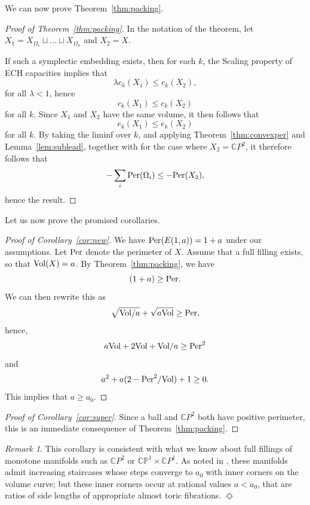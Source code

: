 \documentclass[11pt, reqno]{amsart}
\theoremstyle{remark}
\numberwithin{equation}{subsection}
\numberwithin{figure}{section}
\theoremstyle{customremark}
\newtheorem{rmk_no_diamond}[thm]{Remark}
\newenvironment{rmk}{\begin{rmk_no_diamond} } {\hfill$\er$ \end{rmk_no_diamond}}
\newcommand{\Vol}{{\rm Vol}}
\newcommand{\Per}{{\rm Per}}
\newcommand{\er}{{\Diamond}}
\newcommand{\C}{\mathbb{C}}
\newcommand{\CP}{\mathbb{CP}}
\begin{document}
We can now prove Theorem~\ref{thm:packing}.



\begin{proof}[Proof of Theorem~\ref{thm:packing}]
In the notation of the theorem, let $X_1 = X_{\Omega_1} \sqcup \ldots \sqcup X_{\Omega_n}$ and $X_2 = X$.

If such a symplectic embedding exists, then for each $k$, the Scaling property of ECH capacities implies that
\[ \lambda c_k(X_1) \le c_k(X_2),\]
for all $\lambda < 1$, hence
\[ c_k(X_1) \le c_k(X_2)\]
for all $k$.  Since $X_1$ and $X_2$ have the same volume, it then follows that
\[ e_k(X_1) \le e_k(X_2)\]
for all $k$.  By taking the liminf over $k$, and applying Theorem~\ref{thm:convexper} and Lemma~\ref{lem:sublead}, together with \cite[Thms. 4.1, 7.3]{Helem}
for the case where $X_2 = \mathbb{C}P^2$,
it therefore follows that
\[ - \sum_i \Per(\Omega_i) \le - \Per(X_2),\]
hence the result.
\end{proof}

Let us now prove the promised corollaries.



\begin{proof}[Proof of Corollary~\ref{cor:new}]
We have $\Per(E(1,a)) = 1 + a$ under our assumptions.  Let $\Per$ denote the perimeter of $X$.  Assume that a full filling exists, so that $\Vol(X) = a$.  
By Theorem~\ref{thm:packing},
we have
\[ (1+a) \ge \Per.\]
We can then rewrite this as
\[ \sqrt{\Vol/a} + \sqrt{a \Vol} \ge \Per,\]
hence,
\[ a\Vol + 2 \Vol + \Vol/a \ge \Per^2\]
and
\[ a^2 + a(2 - \Per^2/\Vol) + 1 \ge 0.\]
This implies that $a \ge a_0.$
\end{proof}

\begin{proof}[Proof of Corollary~\ref{cor:super}]
Since a ball and $\mathbb{C}P^2$ both have positive perimeter, this is an immediate consequence of Theorem~\ref{thm:packing}.
\end{proof}

\begin{rmk} This corollary is consistent with what we know about full fillings of monotone manifolds such as $\C P^2$ or $\CP^1\times \C P^1$.  As noted in \cite{AADT}, these manifolds admit increasing staircases whose steps  converge to $a_0$ with inner corners  on  the volume curve; but these inner corners occur at rational values $a< a_0$, that are ratios of side lengths of appropriate almost toric fibrations. 
\end{rmk}
\end{document}
